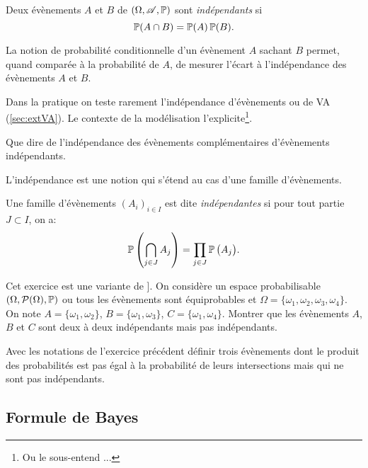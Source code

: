 \documentclass[11pt, a4paper]{article}
\begin{document}
\begin{defn}
  Deux évènements $A$ et $B$ de $(\Omega, \mathscr{A}, \operatorname{\mathbb{P}})$ sont
  \emph{indépendants} si
  \[
    \operatorname{\mathbb{P}}(A \cap B) = \operatorname{\mathbb{P}}(A)\operatorname{\mathbb{P}}(B).
  \]
\end{defn}
\begin{rem}
  La notion de probabilité conditionnelle d'un évènement $A$ sachant
  $B$ permet, quand comparée à la probabilité de $A$, de mesurer
  l'écart à l'indépendance des évènements $A$ et $B$.
\end{rem}
\begin{rem}
  Dans la pratique on teste rarement l'indépendance d'évènements ou de
  VA (\ref{sec:extVA}). Le contexte de la modélisation
  l'explicite\footnote{Ou le sous-entend ... }.
\end{rem}
\begin{question}
  Que dire de l'indépendance des évènements complémentaires
  d'évènements indépendants.
\end{question}
L'indépendance est une notion qui s'étend au cas d'une famille
d'évènements.
\begin{defn}
  Une famille d'évènements $(A_i)_{i \in I}$ est dite
  \emph{indépendantes} si pour tout partie $J \subset I$, on a:
  \[
    \operatorname{\mathbb{P}}\left(\bigcap_{j \in J} A_j\right) = \prod_{j \in J}
    \operatorname{\mathbb{P}}\big(A_j\big).
  \]
\end{defn}
\begin{question}
  Cet exercice est une variante de \cite[Exemple
  3.1]{ouvrard1998probabilites}].  On considère un espace
  probabilisable $(\Omega, \mathcal{P}(\Omega), \operatorname{\mathbb{P}})$ ou tous les
  évènements sont équiprobables et
  $\Omega = \{\omega_1, \omega_2, \omega_3, \omega_4\}$. On note
  $A = \{\omega_1, \omega_2\}$, $B = \{\omega_1, \omega_3\}$,
  $C = \{\omega_1, \omega_4\}$. Montrer que les évènements $A$, $B$ et
  $C$ sont deux à deux indépendants mais pas indépendants.
\end{question}
\begin{question}
  Avec les notations de l'exercice précédent définir trois évènements
  dont le produit des probabilités est pas égal à la probabilité de
  leurs intersections mais qui ne sont pas indépendants.
\end{question}

\subsection{Formule de Bayes}
\label{sec:bayes}
\end{document}
